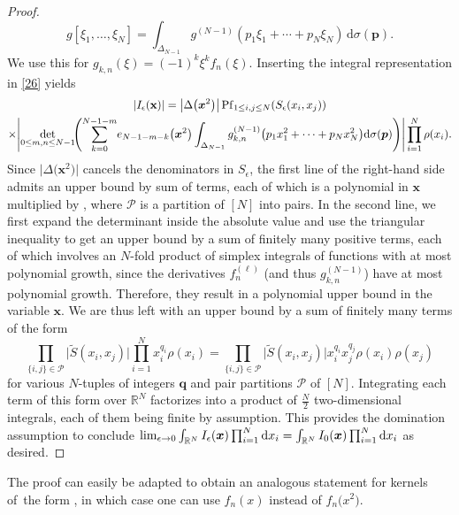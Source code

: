 \documentclass[10pt,a4paper]{amsart}
\numberwithin{equation}{section}
\newcommand{\dd}{\mathrm{d}}
\begin{document}
\begin{proof}
\[
g[\xi_1,\dots,\xi_N] = \int_{\Delta_{N - 1}} g^{(N - 1)}(p_1\xi_1 + \cdots + p_N\xi_N)\,\dd \sigma(\boldsymbol{p}).
\]
We use this for $g_{k,n}(\xi) = (-1)^{k}\xi^k f_n(\xi)$. Inserting the integral representation in \eqref{26} yields
\begin{gather*}
|I_{\epsilon}(\mathbf{x})| = \bigl|\Delta\bigl(\boldsymbol{x}^2\bigr)\bigr| \operatorname{Pf}_{1 \leq i,j \leq N}(S_{\epsilon}(x_i,x_j) ) \\
 \times \Biggl| \mathop{{\rm det}}_{0 \leq m,n \leq N - 1}\!\Biggl( \sum_{k = 0}^{N - 1 - m}\! e_{N - 1 - m - k}\bigl(\boldsymbol{x}^2\bigr) \int_{\Delta_{N - 1}} g_{k,n}^{(N - 1)}\bigl(p_1x_1^2 + \cdots + p_N x_N^2\bigr) \dd \sigma(\boldsymbol{p})\Biggr)\Biggr| \prod_{i = 1}^N \rho(x_i).
\end{gather*}
Since $\bigl|\Delta\bigl(\boldsymbol{x}^2\bigr)\bigr|$ cancels the denominators in $S_{\epsilon}$, the first line of the right-hand side admits an upper bound
by sum of terms, each of which is a polynomial in $\boldsymbol{x}$ multiplied by , where $\mathcal{P}$ is a partition of $[N]$ into pairs. In the second line, we first expand the determinant inside the absolute value and use the triangular inequality to get an upper bound by a sum of finitely many positive terms, each of which involves an $N$-fold product of simplex integrals of functions with at most polynomial growth, since the derivatives $f_{n}^{(\ell)}$ \big(and thus $g_{k,n}^{(N - 1)}$\big) have at most polynomial growth. Therefore, they result in a polynomial upper bound in the variable $\boldsymbol{x}$. We are thus left with an upper bound by a sum of finitely many terms of the form
\[
\prod_{\{i,j\} \in \mathcal{P}} \bigl|\tilde{S}(x_i,x_j)\bigr| \prod_{i = 1}^{N} x_i^{q_i}\rho(x_i) = \prod_{\{i,j\} \in \mathcal{P}} \bigl|\tilde{S}(x_i,x_j)\bigr|x_i^{q_i}x_j^{q_j} \rho(x_i)\rho(x_j)
\]
for various $N$-tuples of integers $\boldsymbol{q}$ and pair partitions $\mathcal{P}$ of $[N]$. Integrating each term of this form over $\mathbb{R}^{N}$ factorizes into a product of $\frac{N}{2}$ two-dimensional integrals, each of them being finite by assumption. This provides the domination assumption to conclude $\smash{\lim_{\epsilon \rightarrow 0} \int_{\mathbb{R}^N} I_{\epsilon}(\boldsymbol{x}) \prod_{i = 1}^N \dd x_i} = \smash{\int_{\mathbb{R}^N} I_0(\boldsymbol{x}) \prod_{i = 1}^N \dd x_i}$ as desired.
\end{proof}

\begin{Remark}
\label{therem} The proof can easily be adapted to obtain an analogous statement for kernels of~the form , in which case one can use $f_n(x)$ instead of $f_n\bigl(x^2\bigr)$.
\end{Remark}
\end{document}
